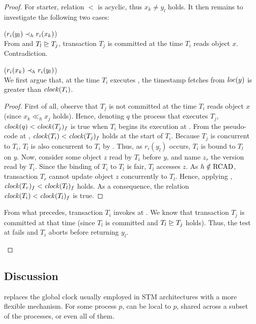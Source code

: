 \begin{proof}
  For starter, relation $<$ is acyclic, thus $x_k \neq y_l$ holds.  
  It then remains to investigate the following two cases:
  \begin{compactitem}
  \item ($r_i(y_l) \hb_h r_i(x_k)$)\\
    From  and $T_l \mathrel{\unrhd} T_j$, transaction $T_j$ is committed at the time $T_i$ reads object $x$.
    Contradiction.
  \item ($r_i(x_k) \hb_h r_i(y_l)$)\\
    We first argue that, at the time $T_i$ executes , the timestamp fetches from $\locationOf{y}$ is greater than $\clockOf{T_i}$.
    \begin{proof}
      First of all, observe that $T_j$ is not committed at the time $T_i$ reads object $x$ (since $x_{k} \ll_h x_{j}$ holds).
      Hence, denoting $q$ the process that executes $T_j$, $\clockOf{q} < \clockOf{T_j}_f$ is true when $T_i$ begins its execution at .
      From the pseudo-code at , $\clockOf{T_i} < \clockOf{T_j}_f$ holds at the start of $T_i$.
      Because $T_j$ is concurrent to $T_i$, $T_l$ is also concurrent to $T_i$ by .
      Thus, as $r_i(y_l)$ occurs, $T_i$ is bound to $T_l$ on $y$.
      Now, consider some object $z$ read by $T_i$ before $y$, and name $z_r$ the version read by $T_i$.
      Since the binding of $T_i$ to $T_l$ is fair, $T_l$ accesses $z$.
      As $h \notin \RCAD$, transaction $T_r$ cannot update object $z$ concurrently to $T_l$.
      Hence, applying , $\clockOf{T_r}_f < \clockOf{T_l}_f$ holds.
      As a consequence, the relation $\clockOf{T_i} < \clockOf{T_l}_f$ is true.
    \end{proof}
    From what precedes, transaction $T_i$ invokes \stmExtendFunction at .
    We know that transaction $T_j$ is committed at that time (since $T_l$ is committed and $T_l \mathrel{\unrhd} T_j$ holds).
    Thus, the test at  fails and $T_i$ aborts before returning $y_l$.
  \end{compactitem}
\end{proof}

\subsection{Discussion}

 replaces the global clock usually employed in STM architectures with a more flexible mechanism.
For some process $p$,  can be local to $p$, shared across a subset of the processes, or even all of them.

